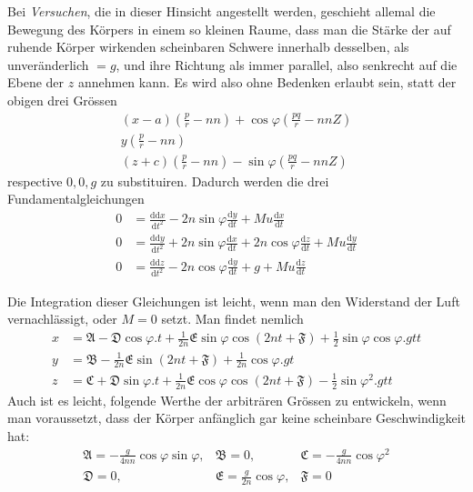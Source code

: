 Bei \textit{Versuchen}, die in dieser Hinsicht angestellt werden, geschieht allemal die Bewegung des Körpers in einem so kleinen Raume, dass man die Stärke der auf ruhende Körper wirkenden scheinbaren Schwere innerhalb desselben, als unveränderlich $=g$, und ihre Richtung als immer parallel, also senkrecht auf die Ebene der $z$ annehmen kann. Es wird also ohne Bedenken erlaubt sein, statt der obigen drei Grössen
\[
\begin{gathered}
(x-a)(\tfrac pr-nn)+\cos\varphi(\tfrac{pq}{r}-nnZ)\\
y(\tfrac pr-nn)\\
(z+c)(\tfrac pr-nn)-\sin\varphi(\tfrac{pq}{r}-nnZ)
\end{gathered}
\]
respective $0,0,g$ zu substituiren. \newline Dadurch werden die drei Fundamentalgleichungen
\[
\begin{aligned}
0&=\frac{\mathrm{dd}x}{\mathrm{d}t^2}-2n\sin\varphi\frac{\mathrm{d}y}{\mathrm{d}t}+Mu\frac{\mathrm{d}x}{\mathrm{d}t}\\
0&=\frac{\mathrm{dd}y}{\mathrm{d}t^2}+2n\sin\varphi\frac{\mathrm{d}x}{\mathrm{d}t}+2n\cos\varphi\frac{\mathrm{d}z}{\mathrm{d}t}+Mu\frac{\mathrm{d}y}{\mathrm{d}t}\\
0&=\frac{\mathrm{dd}z}{\mathrm{d}t^2}-2n\cos\varphi\frac{\mathrm{d}y}{\mathrm{d}t}+g+Mu\frac{\mathrm{d}z}{\mathrm{d}t}
\end{aligned}
\]
\par\clearpage
{}
Die Integration dieser Gleichungen ist leicht, wenn man den Widerstand der Luft vernachlässigt, oder $M=0$ setzt. Man findet nemlich
\[
\begin{aligned}
x&=\mathfrak{A}-\mathfrak{D}\cos\varphi.t+\tfrac{1}{2n}\mathfrak{E}\sin\varphi\cos(2nt+\mathfrak{F})+\tfrac12\sin\varphi\cos\varphi.gtt\\
y&=\mathfrak{B}-\tfrac{1}{2n}\mathfrak{E}\sin(2nt+\mathfrak{F})+\tfrac{1}{2n}\cos\varphi.gt\\
z&=\mathfrak{C}+\mathfrak{D}\sin\varphi.t+\tfrac{1}{2n}\mathfrak{E}\cos\varphi\cos(2nt+\mathfrak{F})-\tfrac12\sin\varphi^2.gtt
\end{aligned}
\]
Auch ist es leicht, folgende Werthe der arbiträren Grössen zu entwickeln, wenn man voraussetzt, dass der Körper anfänglich gar keine scheinbare Geschwindigkeit hat:
\[
\begin{array}{lll}
\mathfrak{A}=-\tfrac{g}{4nn}\cos\varphi\sin\varphi,&\mathfrak{B}=0,&\mathfrak{C}=-\tfrac{g}{4nn}\cos\varphi^2\\
\mathfrak{D}=0,&\mathfrak{E}=\tfrac{g}{2n}\cos\varphi,&\mathfrak{F}=0
\end{array}
\]

